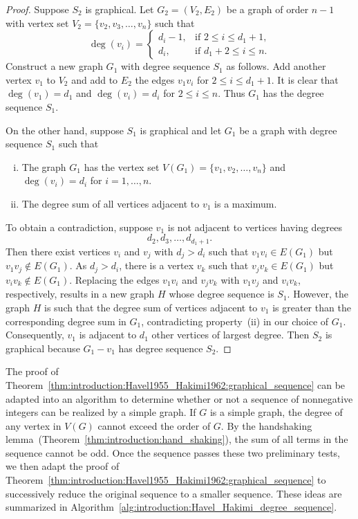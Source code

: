 \begin{proof}
Suppose $S_2$ is graphical. Let $G_2 = (V_2, E_2)$ be a graph of order
$n - 1$ with vertex set $V_2 = \{v_2, v_3, \dots, v_n\}$ such that
\[
\deg(v_i)
=
\begin{cases}
d_i - 1, & \text{if $2 \leq i \leq d_1 + 1$,} \\
d_i,     & \text{if $d_1 + 2 \leq i \leq n$.}
\end{cases}
\]
Construct a new graph $G_1$ with degree sequence $S_1$ as follows. Add
another vertex $v_1$ to $V_2$ and add to $E_2$ the edges $v_1 v_i$ for
$2 \leq i \leq d_1 + 1$. It is clear that $\deg(v_1) = d_1$ and
$\deg(v_i) = d_i$ for $2 \leq i \leq n$. Thus $G_1$ has the degree
sequence $S_1$.

On the other hand, suppose $S_1$ is graphical and let $G_1$ be a graph
with degree sequence $S_1$ such that
\begin{enumerate}[(i)]
\item The graph $G_1$ has the vertex set
  $V(G_1) = \{v_1, v_2, \dots, v_n\}$ and $\deg(v_i) = d_i$ for
  $i = 1, \dots, n$.

\item The degree sum of all vertices adjacent to $v_1$ is a maximum.
\end{enumerate}
To obtain a contradiction, suppose $v_1$ is not adjacent to vertices
having degrees
\[
d_2, d_3, \dots, d_{d_1 + 1}.
\]
Then there exist vertices $v_i$ and $v_j$ with $d_j > d_i$ such that
$v_1 v_i \in E(G_1)$ but $v_1 v_j \not\in E(G_1)$. As $d_j > d_i$,
there is a vertex $v_k$ such that $v_j v_k \in E(G_1)$ but
$v_i v_k \not\in E(G_1)$. Replacing the edges $v_1 v_i$ and $v_j v_k$
with $v_1 v_j$ and $v_i v_k$, respectively, results in a new graph $H$
whose degree sequence is $S_1$. However, the graph $H$ is such that
the degree sum of vertices adjacent to $v_1$ is greater than the
corresponding degree sum in $G_1$, contradicting property~(ii) in our
choice of $G_1$. Consequently, $v_1$ is adjacent to $d_1$ other
vertices of largest degree. Then $S_2$ is graphical because
$G_1 - v_1$ has degree sequence $S_2$.
\end{proof}

The proof of
Theorem~\ref{thm:introduction:Havel1955_Hakimi1962:graphical_sequence}
can be adapted into an algorithm to determine whether or not a
sequence of nonnegative integers can be realized by a simple
graph. If $G$ is a simple graph, the degree of any vertex in $V(G)$
cannot exceed the order of $G$. By the handshaking
lemma~(Theorem~\ref{thm:introduction:hand_shaking}), the sum of all
terms in the sequence cannot be odd. Once the sequence passes these
two preliminary tests, we then adapt the proof of
Theorem~\ref{thm:introduction:Havel1955_Hakimi1962:graphical_sequence}
to successively reduce the original sequence to a smaller
sequence. These ideas are summarized in
Algorithm~\ref{alg:introduction:Havel_Hakimi_degree_sequence}.

